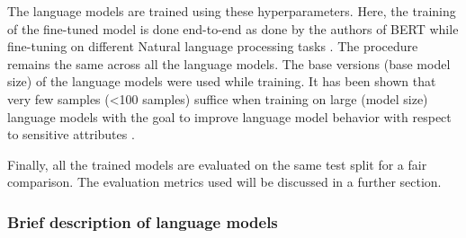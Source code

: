 \begin{table}[h!]
\caption{Hyperparameter search results for language models}
\label{tab:search_results}
\end{table}

The language models are trained using these hyperparameters. Here, the training of the fine-tuned model is done end-to-end as done by the authors of BERT while fine-tuning on different Natural language processing tasks \cite{devlin2018bert}. The procedure remains the same across all the language models. The base versions (base model size) of the language models were used while training. It has been shown that very few samples (<100 samples) suffice when training on large (model size) language models with the goal to improve language model behavior with respect to sensitive attributes \cite{solaiman2021process}. 

Finally, all the trained models are evaluated on the same test split for a fair comparison. The evaluation metrics used will be discussed in a further section.


\subsubsection{Brief description of language models}

